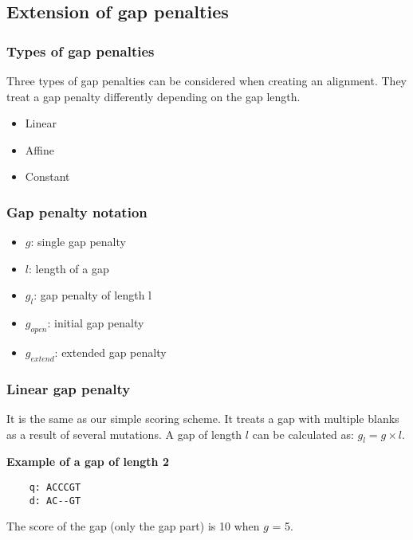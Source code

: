 %
%

%
%
\subsection{Extension of gap penalties}

%
%
\subsubsection*{Types of gap penalties}
Three types of gap penalties can be considered when creating an alignment. They treat a gap penalty differently depending on the gap length.

\begin{itemize}
\item Linear
\item Affine
\item Constant
\end{itemize}

%
%
\subsubsection*{Gap penalty notation}
\begin{itemize}
\item $g$: single gap penalty
\item $l$: length of a gap
\item $g_l$: gap penalty of length l
\item $g_{open}$: initial gap penalty
\item $g_{extend}$: extended gap penalty
\end{itemize}

%
%
\subsubsection*{Linear gap penalty}
It is the same as our simple scoring scheme. It treats a gap with multiple blanks as a result of several mutations. A gap of length $l$ can be calculated as: $g_l = g \times l$.
\medskip 

\noindent
\textbf{Example of a gap of length 2}
\begin{verbatim}
    q: ACCCGT
    d: AC--GT
\end{verbatim}
The score of the gap (only the gap part) is 10 when $g$ = 5. 

